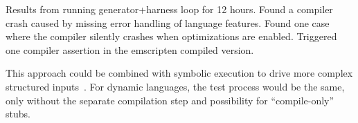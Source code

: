 Results from running generator+harness loop for 12 hours. Found a compiler crash caused by missing error handling of language features.
%
%
Found one case where the compiler silently crashes when optimizations are enabled.
%
Triggered one compiler assertion in the emscripten compiled version.

 This approach could be combined with symbolic execution to drive more complex structured inputs~\cite{Braione2017}. For dynamic languages, the test process would be the same, only without the separate compilation step and possibility for ``compile-only'' stubs.
